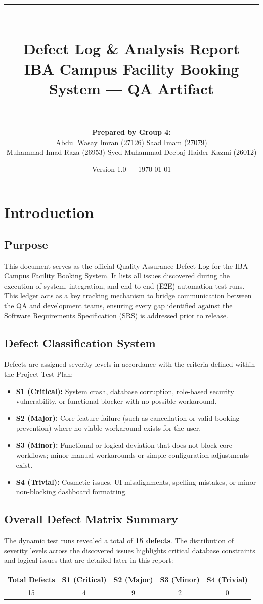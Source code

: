 \documentclass[11pt,a4paper]{article}
\title{
    \rule{\textwidth}{1.5pt} \\
    \textbf{\Large Defect Log \& Analysis Report} \\
    \large IBA Campus Facility Booking System --- QA Artifact \\
    \rule{\textwidth}{1.5pt}
}
\author{
    \textbf{Prepared by Group 4:} \\
    Abdul Wasay Imran (27126) \quad Saad Imam (27079) \\
    Muhammad Imad Raza (26953) \quad Syed Muhammad Deebaj Haider Kazmi (26012)
}
\date{Version 1.0 --- \today}
\begin{document}
\maketitle
\newpage
\newpage

\section{Introduction}

\subsection{Purpose}
This document serves as the official Quality Assurance Defect Log for the IBA Campus Facility Booking System. It lists all issues discovered during the execution of system, integration, and end-to-end (E2E) automation test runs. This ledger acts as a key tracking mechanism to bridge communication between the QA and development teams, ensuring every gap identified against the Software Requirements Specification (SRS) is addressed prior to release.

\subsection{Defect Classification System}
Defects are assigned severity levels in accordance with the criteria defined within the Project Test Plan:
\begin{itemize}[noitemsep,topsep=3pt]
    \item \textbf{S1 (Critical):} System crash, database corruption, role-based security vulnerability, or functional blocker with no possible workaround.
    \item \textbf{S2 (Major):} Core feature failure (such as cancellation or valid booking prevention) where no viable workaround exists for the user.
    \item \textbf{S3 (Minor):} Functional or logical deviation that does not block core workflows; minor manual workarounds or simple configuration adjustments exist.
    \item \textbf{S4 (Trivial):} Cosmetic issues, UI misalignments, spelling mistakes, or minor non-blocking dashboard formatting.
\end{itemize}

\subsection{Overall Defect Matrix Summary}
The dynamic test runs revealed a total of \textbf{15 defects}. The distribution of severity levels across the discovered issues highlights critical database constraints and logical issues that are detailed later in this report:
\begin{center}
\begin{tabular}{@{}ccccc@{}}
\toprule
\textbf{Total Defects} & \textbf{S1 (Critical)} & \textbf{S2 (Major)} & \textbf{S3 (Minor)} & \textbf{S4 (Trivial)} \\ \midrule
15 & 4 & 9 & 2 & 0 \\ \bottomrule
\end{tabular}
\end{center}
\end{document}
